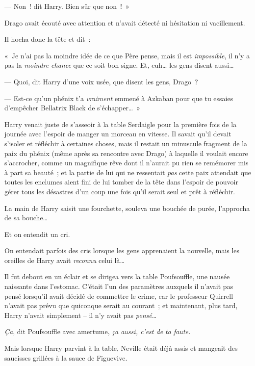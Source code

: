 --- Non~! dit Harry.
Bien sûr que non~!~»

Drago avait écouté avec attention et n'avait détecté ni hésitation ni vacillement.

Il hocha donc la tête et dit~:

«~Je n'ai pas la moindre idée de ce que Père pense, mais il est \emph{impossible}, il n'y a pas la \emph{moindre chance} que ce soit bon signe.
Et, euh… les gens disent aussi…

--- Quoi, dit Harry d'une voix usée, que disent les gens, Drago~?

--- Est-ce qu'un phénix t'a \emph{vraiment} emmené à Azkaban pour que tu essaies d'empêcher Bellatrix Black de s'échapper…~»


Harry venait juste de s'asseoir à la table Serdaigle pour la première fois de la journée avec l'espoir de manger un morceau en vitesse.
Il savait qu'il devait s'isoler et réfléchir à certaines choses, mais il restait un minuscule fragment de la paix du phénix (même après sa rencontre avec Drago) à laquelle il voulait encore s'accrocher, comme un magnifique rêve dont il n'aurait pu rien se remémorer mis à part sa beauté~; et la partie de lui qui ne ressentait \emph{pas} cette paix attendait que toutes les enclumes aient fini de lui tomber de la tête dans l'espoir de pouvoir gérer tous les désastres d'un coup une fois qu'il serait seul et prêt à réfléchir.

La main de Harry saisit une fourchette, souleva une bouchée de purée, l'approcha de sa bouche…

Et on entendit un cri.

On entendait parfois des cris lorsque les gens apprenaient la nouvelle, mais les oreilles de Harry avait \emph{reconnu} celui là…

Il fut debout en un éclair et se dirigea vers la table Poufsouffle, une nausée naissante dans l'estomac.
C'était l'un des paramètres auxquels il n'avait pas pensé lorsqu'il avait décidé de commettre le crime, car le professeur Quirrell n'avait pas prévu que quiconque serait au courant~; et maintenant, plus tard, Harry n'avait simplement -- il n'y avait pas \emph{pensé}…

\emph{Ça}, dit Poufsouffle avec amertume, \emph{ça aussi, c'est de ta faute.}

Mais lorsque Harry parvint à la table, Neville était déjà assis et mangeait des saucisses grillées à la sauce de Figuevive.


